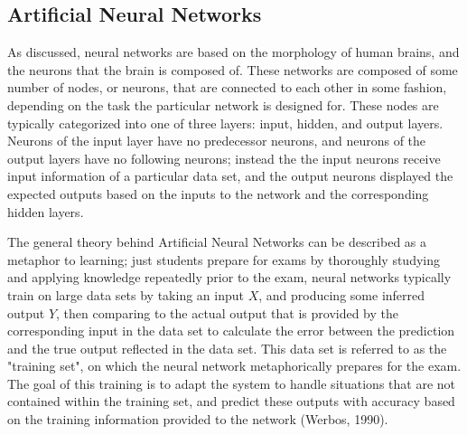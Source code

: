 \documentclass[11pt]{article}
\begin{document}
\subsection{Artificial Neural Networks}
As discussed, neural networks are based on the morphology of human brains, and the neurons that the brain is composed of. These networks are composed of some number of nodes, or neurons, that are connected to each other in some fashion, depending on the task the particular network is designed for. These nodes are typically categorized into one of three layers: input, hidden, and output layers. Neurons of the input layer have no predecessor neurons, and neurons of the output layers have no following neurons; instead the the input neurons receive input information of a particular data set, and the output neurons displayed the expected outputs based on the inputs to the network and the corresponding hidden layers.\par

The general theory behind Artificial Neural Networks can be described as a metaphor to learning; just students prepare for exams by thoroughly studying and applying knowledge repeatedly prior to the exam, neural networks typically train on large data sets by taking an input $X$, and producing some inferred output $Y$, then comparing to the actual output that is provided by the corresponding input in the data set to calculate the error between the prediction and the true output reflected in the data set. This data set is referred to as the "training set", on which the neural network  metaphorically prepares for the exam. The goal of this training is to adapt the system to handle situations that are not contained within the training set, and predict these outputs with accuracy based on the training information provided to the network (Werbos, 1990).\par
\end{document}
